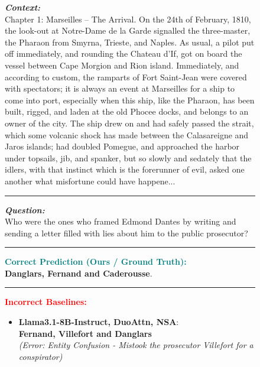\begin{figure}[ht]
\begin{AcademicBox}
\small
\setlength{\parindent}{0pt}

\textbf{\textit{Context:}} \\
Chapter 1:  Marseilles – The Arrival. 
On the 24th of February, 1810, the look-out at Notre-Dame de la Garde 
signalled the three-master, the Pharaon from Smyrna, Trieste, and Naples. 
As usual, a pilot put off immediately, and rounding the Chateau d’If, got 
on board the vessel between Cape Morgion and Rion island. 
Immediately, and according to custom, the ramparts of Fort Saint-Jean 
were covered with spectators; it is always an event at Marseilles for a ship 
to come into port, especially when this ship, like the Pharaon, has been 
built, rigged, and laden at the old Phocee docks, and belongs to an owner 
of the city. 
The ship drew on and had safely passed the strait, which some volcanic 
shock has made between the Calasareigne and Jaros islands; had doubled 
Pomegue, and approached the harbor under topsails, jib, and spanker, but 
so slowly and sedately that the idlers, with that instinct which is the 
forerunner of evil, asked one another what misfortune could have 
happene...
\vspace{4pt} \hrule \vspace{4pt}

\textbf{\textit{Question:}} \\
Who were the ones who framed Edmond Dantes by writing and sending a letter filled with lies about him to the public prosecutor?
\vspace{4pt} \hrule \vspace{4pt}

\textbf{\textcolor{teal}{Correct Prediction (Ours / Ground Truth):}} \hfill \textcolor{teal}{\checkmark} \\
\textbf{Danglars, Fernand and Caderousse}.
\vspace{4pt} \hrule \vspace{4pt}

\textbf{\textcolor{red}{Incorrect Baselines:}} \\
\footnotesize
\begin{itemize}[leftmargin=*, label={}, itemsep=4pt, topsep=2pt]
 \item \textbf{Llama3.1-8B-Instruct, DuoAttn, NSA}: \\
 \textbf{Fernand, Villefort and Danglars} \\
    \textit{(Error: Entity Confusion - Mistook the prosecutor Villefort for a conspirator)}


\end{itemize}
\end{AcademicBox}
\end{figure}
